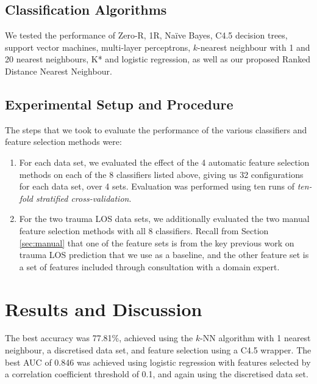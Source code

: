 \documentclass{article}
\begin{document}
\subsection{Classification Algorithms}
We tested the performance of Zero-R, 1R, Na\"{i}ve Bayes, C4.5 decision trees,
support vector machines, multi-layer perceptrons, $k$-nearest neighbour with 1
and 20 nearest neighbours, K* and logistic regression, as well as our proposed
Ranked Distance Nearest Neighbour.

\subsection{Experimental Setup and Procedure}
The steps that we took to evaluate the performance of the various classifiers
and feature selection methods were:
\begin{enumerate}
\item For each data set, we evaluated the effect of the 4 automatic feature
selection methods on each of the 8 classifiers listed above, giving us 32
configurations for each data set, over
4 sets. Evaluation was performed using ten runs of \textit{ten-fold stratified
cross-validation}.
\item For the two trauma LOS data sets, we additionally evaluated the two
manual feature selection methods with all 8 classifiers. Recall from Section
\ref{sec:manual} that one of the feature sets is from the key previous work
on trauma LOS prediction that we use as a baseline, and the other feature set
is a set of features included through consultation with a domain expert.
\end{enumerate}

\section{Results and Discussion}
\label{sec:results}
The best accuracy was 77.81\%, achieved using the $k$-NN algorithm
with 1 nearest neighbour, a discretised data set, and feature selection using a
C4.5 wrapper. The best AUC of 0.846 was achieved using logistic regression with
features selected by a correlation coefficient threshold of 0.1, and again
using the discretised data set.
\end{document}
